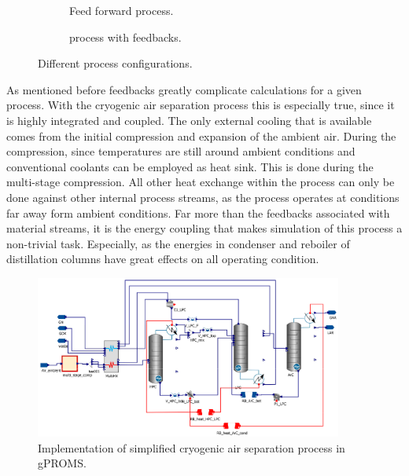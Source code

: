         \begin{figure}
            \centering
            \begin{subfigure}{0.4\textwidth}
                
                \caption{Feed forward process.}
                \label{fig:foreward_process}
            \end{subfigure}
            \hspace{0.05\textwidth}
            \begin{subfigure}{0.4\textwidth}
                
                \caption{process with feedbacks.}
                \label{fig:feedback_process}
            \end{subfigure}
            \caption{Different process configurations.}
        \end{figure}

        As mentioned before feedbacks greatly complicate calculations for a given process. With the cryogenic air separation
        process this is especially true, since it is highly integrated and coupled. The only external cooling that is available
        comes from the initial compression and expansion of the ambient air. During the compression, since temperatures are
        still around ambient conditions and conventional coolants can be employed as heat sink. This is done during the
        multi-stage compression. All other heat exchange within the process can only be done against other internal process
        streams, as the process operates at conditions far away form ambient conditions. Far more than the feedbacks associated
        with material streams, it is the energy coupling that makes simulation of this process a non-trivial task. Especially, as
        the energies in condenser and reboiler of distillation columns have great effects on all operating condition.

        \begin{figure}
            \centering
            \includegraphics[width=0.9\textwidth]{Pictures/ASU_simple_gPROMS.eps}
            \caption{Implementation of simplified cryogenic air separation process in gPROMS.}
            \label{fig:ASU_simple_gproms}
        \end{figure}

